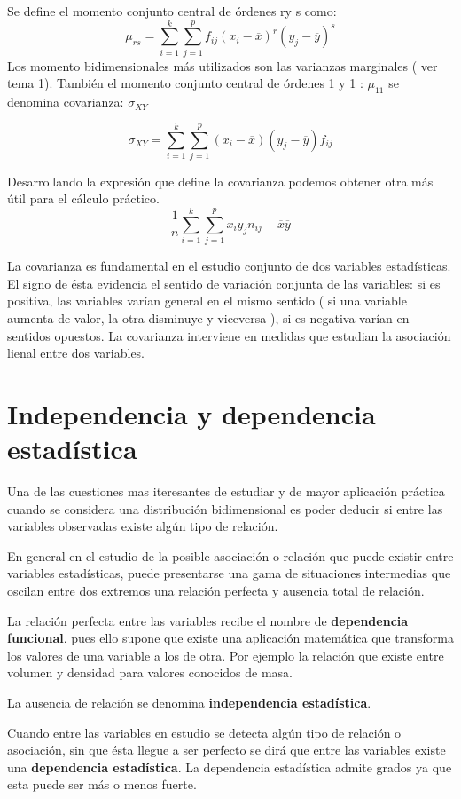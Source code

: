 \documentclass{article}
\begin{document}
	Se define el momento conjunto central de órdenes ry s como:
	$$ \mu _{rs} = \sum_{i=1}^k \sum_{j=1}^p f_{ij} ( x_i - \overline{x} )^r (y_j - \overline{y} )^s
$$
	Los momento bidimensionales más utilizados son las varianzas marginales ( ver tema 1). También el momento conjunto central de órdenes 1 y 1 : $\mu _{11}$ se denomina covarianza: $\sigma_{XY}$
	
	$$\sigma_{XY} = \sum_{i=1}^k \sum_{j=1}^p (x_i - \overline{x} )( y_j - \overline{y} ) f_{ij} $$
	
	Desarrollando la expresión que define la covarianza podemos obtener otra más útil para el cálculo práctico. 
	$$ \frac{1}{n} \sum_{i=1}^k \sum_{j=1}^p x_i y_j n_{ij} - \overline{x} \overline{y} $$
	
	La covarianza es fundamental en el estudio conjunto de dos variables estadísticas. El signo de ésta evidencia el sentido de variación conjunta de las variables: si es positiva, las variables varían general en el mismo sentido ( si una variable aumenta de valor, la otra disminuye y viceversa ), si es negativa varían en sentidos opuestos. La covarianza interviene en medidas que estudian la asociación lienal entre dos variables.
 \section{Independencia y dependencia estadística}
 
 Una de las cuestiones mas iteresantes de estudiar y de mayor aplicación práctica cuando se considera una distribución bidimensional es poder deducir si entre las variables observadas existe algún tipo de relación.
 
 En general en el estudio de la posible asociación o relación que puede existir entre variables estadísticas, puede presentarse una gama de situaciones intermedias que oscilan entre dos extremos una relación perfecta y ausencia total de relación.

 La relación perfecta entre las variables recibe el nombre de \textbf{dependencia funcional}. pues ello supone que existe una aplicación matemática que transforma los valores de una variable a los de otra. Por ejemplo la relación que existe entre volumen y densidad para valores conocidos de masa.
 
 La ausencia de relación se denomina \textbf{independencia estadística}.
 
 Cuando entre las variables en estudio se detecta algún tipo de relación o asociación, sin que ésta llegue a ser perfecto se dirá que entre las variables existe una \textbf{dependencia estadística}. La dependencia estadística admite grados ya que esta puede ser más o menos fuerte.
 
\end{document}
